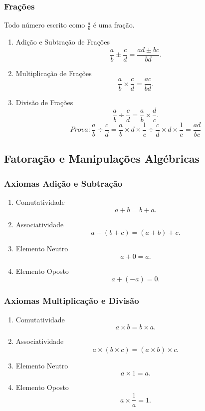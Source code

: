 \documentclass[12pt,a4paper]{article}
\begin{document}
\subsubsection{Frações}
Todo número escrito como $\frac{a}{b}$ é uma fração.

\begin{enumerate}
    \item Adição e Subtração de Frações
    \[
    \frac{a}{b} \pm \frac{c}{d} = \frac{ad \pm bc}{bd}.
    \]
    \item Multiplicação de Frações
    \[
    \frac{a}{b} \times \frac{c}{d} = \frac{ac}{bd}.
    \]
    \item Divisão de Frações
    \[
    \frac{a}{b} \div \frac{c}{d} = \frac{a}{b} \times \frac{d}{c}.
    \]
    \[
    Prova:
        \frac{a}{b} \div \frac{c}{d}
        = \frac{a}{b} \times d \times \frac{1}{c} \div \frac{c}{d} \times d \times \frac{1}{c}
        = \frac{ad}{bc}
    \]
\end{enumerate}

\clearpage

\subsection{Fatoração e Manipulações Algébricas}
\subsubsection{Axiomas Adição e Subtração}
\begin{enumerate}
    \item Comutatividade
    \[
    a + b = b + a.
    \]
    \item Associatividade
    \[
    a + (b + c) = (a + b) + c.
    \]
    \item Elemento Neutro
    \[
    a + 0 = a.
    \]
    \item Elemento Oposto
    \[
    a + (-a) = 0.
    \]
\end{enumerate}

\subsubsection{Axiomas Multiplicação e Divisão}
\begin{enumerate}
    \item Comutatividade
    \[
    a \times b = b \times a.
    \]
    \item Associatividade
    \[
    a \times (b \times c) = (a \times b) \times c.
    \]
    \item Elemento Neutro
    \[
    a \times 1 = a.
    \]
    \item Elemento Oposto
    \[
    a \times \frac{1}{a} = 1.
    \]
\end{enumerate}
\end{document}
